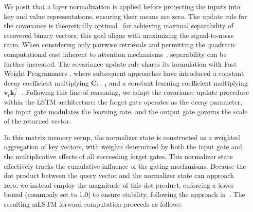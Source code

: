 We posit that a layer normalization is applied before projecting the inputs into key and value representations, ensuring their means are zero. The update rule for the covariance is theoretically optimal~\citep{Dayan:91} for achieving maximal separability of recovered binary vectors; this goal aligns with maximizing the signal-to-noise ratio. When considering only pairwise retrievals and permitting the quadratic computational cost inherent to attention mechanisms~\citep{Krotov:16,Krotov:17,Ramsauer:21}, separability can be further increased. The covariance update rule shares its formulation with Fast Weight Programmers \citep{Schmidhuber:92ncfastweights,Schlag:21}, where subsequent approaches have introduced a constant decay coefficient multiplying $\mathbf{C}_{t-1}$ and a constant learning coefficient multiplying 
$\mathbf{v}_{t} \mathbf{k}_t ^\top$~\citep{Ba:16}.
Following this line of reasoning, we adapt the covariance update procedure within the LSTM architecture: the forget gate operates as the decay parameter, the input gate modulates the learning rate, and the output gate governs the scale of the returned vector.

In this matrix memory setup, the normalizer state is constructed as a weighted aggregation of key vectors, with weights determined by both the input gate and the multiplicative effects of all succeeding forget gates. This normalizer state effectively tracks the cumulative influence of the gating mechanisms. Because the dot product between the query vector and the normalizer state can approach zero, we instead employ the magnitude of this dot product, enforcing a lower bound (commonly set to 1.0) to ensure stability, following the approach in~\citep{Sun:23arxiv}. The resulting mLSTM forward computation proceeds as follows:

